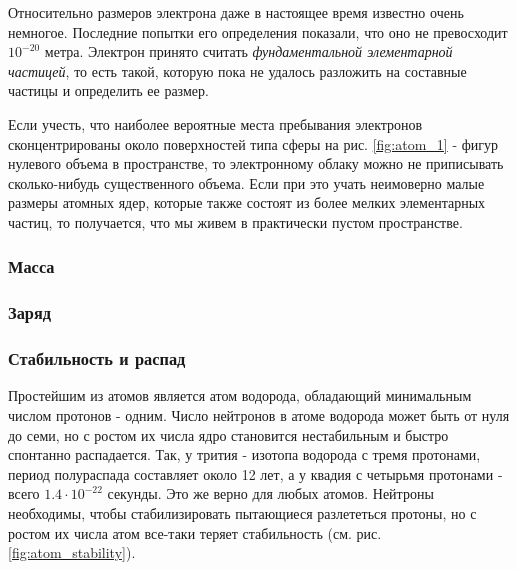 Относительно размеров электрона даже в настоящее время известно очень немногое.
Последние попытки его определения показали, что оно не превосходит $10^{-20}$ метра.
Электрон принято считать \textit{фундаментальной элементарной частицей}, то есть такой, которую пока не удалось разложить на составные частицы и определить ее размер.

Если учесть, что наиболее вероятные места пребывания электронов сконцентрированы около поверхностей типа сферы на рис. \ref{fig:atom_1} - фигур нулевого объема в пространстве, то электронному облаку можно не приписывать сколько-нибудь существенного объема.
Если при это учать неимоверно малые размеры атомных ядер, которые также состоят из более мелких элементарных частиц, то получается, что мы живем в практически пустом пространстве.







\subsubsection*{Масса}

\subsubsection*{Заряд}

\subsubsection*{Стабильность и распад}

Простейшим из атомов является атом водорода, обладающий минимальным числом протонов - одним.
Число нейтронов в атоме водорода может быть от нуля до семи, но с ростом их числа ядро становится нестабильным и быстро спонтанно распадается.
Так, у трития - изотопа водорода с тремя протонами, период полураспада составляет около 12 лет, а у квадия с четырьмя протонами - всего $1.4\cdot 10^{−22}$ секунды.
Это же верно для любых атомов.
Нейтроны необходимы, чтобы стабилизировать пытающиеся разлететься протоны, но с ростом их числа атом все-таки теряет стабильность (см. рис. \ref{fig:atom_stability}).


